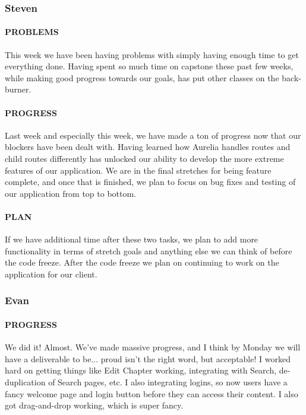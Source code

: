 \documentclass[onecolumn, draftclsnofoot,10pt, compsoc]{IEEEtran}
\begin{document}
	\subsubsection{Steven}
	
	\paragraph{PROBLEMS}
	This week we have been having problems with simply having enough time to get everything done. Having spent so much time on capstone these past few weeks, while making good progress towards our goals, has put other classes on the back-burner.
	
	\paragraph{PROGRESS}
	Last week and especially this week, we have made a ton of progress now that our blockers have been dealt with. Having learned how Aurelia handles routes and child routes differently has unlocked our ability to develop the more extreme features of our application. We are in the final stretches for being feature complete, and once that is finished, we plan to focus on bug fixes and testing of our application from top to bottom. 
	
	\paragraph{PLAN}
	If we have additional time after these two tasks, we plan to add more functionality in terms of stretch goals and anything else we can think of before the code freeze. After the code freeze we plan on continuing to work on the application for our client.
	
	\subsubsection{Evan}
	
	\paragraph{PROGRESS}
	
	We did it! Almost. We've made massive progress, and I think by Monday we will have a deliverable to be... proud isn't the right word, but acceptable! I worked hard on getting things like Edit Chapter working, integrating with Search, de-duplication of Search pages, etc. I also integrating logins, so now users have a fancy welcome page and login button before they can access their content. I also got drag-and-drop working, which is super fancy. 
	
\end{document}
